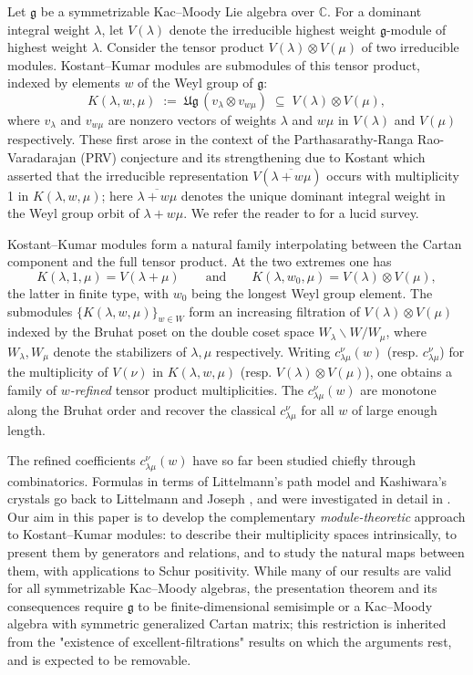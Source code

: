 \documentclass[12pt,reqno]{amsart}
\theoremstyle{plain}
\theoremstyle{definition}
\theoremstyle{remark}
\theoremstyle{plain}
\newcommand{\lie}{\mathfrak}
\newcommand{\lrw}{c_{\lambda\mu}^\nu(w)}
\newcommand{\lr}{c_{\lambda\mu}^\nu}
\begin{document}
Let $\lie g$ be a symmetrizable Kac--Moody Lie algebra over $\mathbb{C}$. 
For a dominant integral weight $\lambda$, let $V(\lambda)$ denote the
irreducible highest weight $\lie g$-module of highest weight $\lambda$. 
Consider the tensor product $V(\lambda) \otimes V(\mu)$ of two irreducible modules. Kostant--Kumar modules are submodules of this tensor product, indexed by elements $w$ of the Weyl group of $\lie g$:
\[
    K(\lambda,w,\mu)\;:=\;\lie{Ug}\,(v_\lambda\otimes v_{w\mu})
    \;\subseteq\; V(\lambda)\otimes V(\mu),
\]
where $v_\lambda$ and $v_{w\mu}$ are nonzero vectors of weights $\lambda$
and $w\mu$ in $V(\lambda)$ and $V(\mu)$ respectively. These first arose in the context of the Parthasarathy-Ranga Rao-Varadarajan (PRV) conjecture and its strengthening due to Kostant which asserted that the irreducible representation $V(\overline{\lambda+w\mu})$ occurs with multiplicity 1 in $K(\lambda,w,\mu)$; here $\overline{\lambda+w\mu}$ denotes the unique dominant integral weight in the Weyl group orbit of $\lambda+w\mu$. We refer the reader to \cite{apoorva-prv} for a lucid survey.


Kostant--Kumar modules form a natural family interpolating between the
Cartan component and the full tensor product. At the two extremes one has
\[
    K(\lambda,1,\mu)=V(\lambda+\mu)
    \qquad\text{and}\qquad
    K(\lambda,w_0,\mu)=V(\lambda)\otimes V(\mu),
\]
the latter in finite type, with $w_0$ being the longest Weyl group element. 
The submodules $\{K(\lambda,w,\mu)\}_{w \in W}$ form an increasing filtration of
$V(\lambda)\otimes V(\mu)$ indexed by the Bruhat poset on the double coset space
$W_\lambda\backslash W/W_\mu$, where $W_\lambda, W_\mu$ denote the stabilizers of $\lambda, \mu$ respectively. Writing $\lrw$ (resp. $\lr$) for the multiplicity of
$V(\nu)$ in $K(\lambda,w,\mu)$ (resp. $V(\lambda) \otimes V(\mu)$), one obtains a family of \emph{$w$-refined}
tensor product multiplicities. The $\lrw$ are monotone along the
Bruhat order and recover the classical $\lr$ for all $w$ of large enough length.

The refined coefficients $\lrw$ have so far been studied chiefly through
combinatorics. Formulas in terms of Littelmann's path model and
Kashiwara's crystals go back to Littelmann \cite{L1,L2} and
Joseph \cite{J2}, and were investigated in detail in \cite{KRV}. Our
aim in this paper is to develop the complementary \emph{module-theoretic} approach to
 Kostant--Kumar modules: to describe their multiplicity spaces
intrinsically, to present them by generators and relations, and to study
the natural maps between them, with applications to Schur positivity.
While many of our results are valid for all symmetrizable
Kac--Moody algebras, the presentation theorem and its consequences require
$\lie g$ to be finite-dimensional semisimple or a
Kac--Moody algebra with symmetric generalized Cartan matrix; this restriction is inherited from the
"existence of excellent-filtrations" results on which the arguments rest, and is expected
to be removable.
\end{document}

